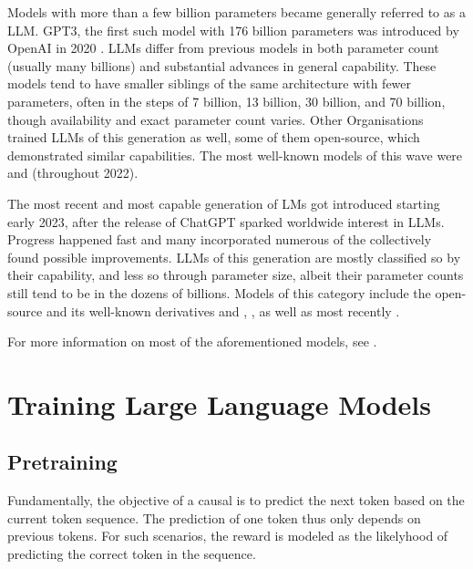 Models with more than a few billion parameters became generally referred to as a \acrlong{LLM}. \gls{GPT3}, the first such model with 176 billion parameters was introduced by \gls{OpenAI} in 2020 \cite{brown_language_2020}.
\glspl{LLM} differ from previous models in both parameter count (usually many billions) and substantial advances in general capability.
These models tend to have smaller siblings of the same architecture with fewer parameters, often in the steps of 7 billion, 13 billion, 30 billion, and 70 billion, though availability and exact parameter count varies.
Other Organisations trained \glspl{LLM} of this generation as well, some of them open-source, which demonstrated similar capabilities.
The most well-known models of this wave were  and  (throughout 2022).

The most recent and most capable generation of \glspl{LM} got introduced starting early 2023, after the release of \gls{ChatGPT} sparked worldwide interest in \glspl{LLM}. Progress happened fast and many incorporated numerous of the collectively found possible improvements. \glspl{LLM} of this generation are mostly classified so by their capability, and less so through parameter size, albeit their parameter counts still tend to be in the dozens of billions. Models of this category include the open-source  and its well-known derivatives  and , , as well as most recently .

For more information on most of the aforementioned models, see .


\section{Training Large Language Models}\label{sec:training}


\subsection{Pretraining}\label{sub:pretraining}
Fundamentally, the objective of a \gls{causal} is to predict the next token based on the current token sequence.
The prediction of one token thus only depends on previous tokens.
For such scenarios, the reward is modeled as the likelyhood of predicting the correct token in the sequence.

